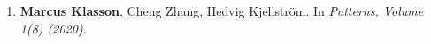 

\begin{enumerate}
	\item[] \textbf{Marcus Klasson}, Cheng Zhang, Hedvig Kjellström. In \textit{Patterns, Volume 1(8) (2020)}.
\end{enumerate}

